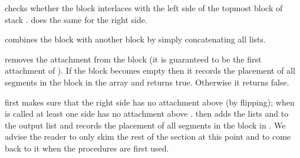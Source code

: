  checks whether the block interlaces with the left side
of the topmost block of
stack .  does the same for the right side.

 combines the block with another block  by
simply concatenating all
lists.

 removes the attachment  from the block  (it is
guaranteed to be the
first attachment of ). If the block becomes empty then it records the
placement of all segments in the block in the array  and returns
true.
Otherwise it returns false.

 first makes sure that the right side has no attachment
above 
(by
flipping); when  is called at least one side has no
attachment above .
 then adds the lists  and  to
the output list 
and records the placement of all segments in the block in .
We advise the reader to only skim the rest of the section at this
point and to come back to it when the procedures are first used.


